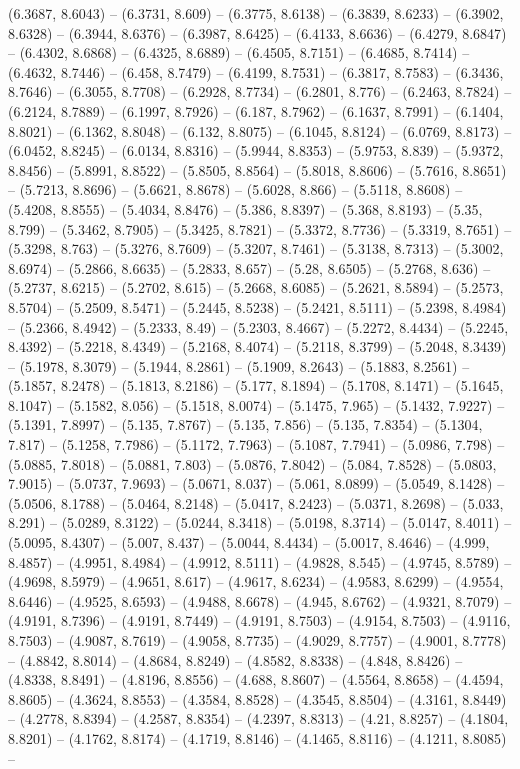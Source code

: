 (6.3687, 8.6043) -- (6.3731, 8.609) -- (6.3775, 8.6138) -- (6.3839, 8.6233) -- (6.3902, 8.6328) -- (6.3944, 8.6376) -- (6.3987, 8.6425) -- (6.4133, 8.6636) -- (6.4279, 8.6847) -- (6.4302, 8.6868) -- (6.4325, 8.6889) -- (6.4505, 8.7151) -- (6.4685, 8.7414) -- (6.4632, 8.7446) -- (6.458, 8.7479) -- (6.4199, 8.7531) -- (6.3817, 8.7583) -- (6.3436, 8.7646) -- (6.3055, 8.7708) -- (6.2928, 8.7734) -- (6.2801, 8.776) -- (6.2463, 8.7824) -- (6.2124, 8.7889) -- (6.1997, 8.7926) -- (6.187, 8.7962) -- (6.1637, 8.7991) -- (6.1404, 8.8021) -- (6.1362, 8.8048) -- (6.132, 8.8075) -- (6.1045, 8.8124) -- (6.0769, 8.8173) -- (6.0452, 8.8245) -- (6.0134, 8.8316) -- (5.9944, 8.8353) -- (5.9753, 8.839) -- (5.9372, 8.8456) -- (5.8991, 8.8522) -- (5.8505, 8.8564) -- (5.8018, 8.8606) -- (5.7616, 8.8651) -- (5.7213, 8.8696) -- (5.6621, 8.8678) -- (5.6028, 8.866) -- (5.5118, 8.8608) -- (5.4208, 8.8555) -- (5.4034, 8.8476) -- (5.386, 8.8397) -- (5.368, 8.8193) -- (5.35, 8.799) -- (5.3462, 8.7905) -- (5.3425, 8.7821) -- (5.3372, 8.7736) -- (5.3319, 8.7651) -- (5.3298, 8.763) -- (5.3276, 8.7609) -- (5.3207, 8.7461) -- (5.3138, 8.7313) -- (5.3002, 8.6974) -- (5.2866, 8.6635) -- (5.2833, 8.657) -- (5.28, 8.6505) -- (5.2768, 8.636) -- (5.2737, 8.6215) -- (5.2702, 8.615) -- (5.2668, 8.6085) -- (5.2621, 8.5894) -- (5.2573, 8.5704) -- (5.2509, 8.5471) -- (5.2445, 8.5238) -- (5.2421, 8.5111) -- (5.2398, 8.4984) -- (5.2366, 8.4942) -- (5.2333, 8.49) -- (5.2303, 8.4667) -- (5.2272, 8.4434) -- (5.2245, 8.4392) -- (5.2218, 8.4349) -- (5.2168, 8.4074) -- (5.2118, 8.3799) -- (5.2048, 8.3439) -- (5.1978, 8.3079) -- (5.1944, 8.2861) -- (5.1909, 8.2643) -- (5.1883, 8.2561) -- (5.1857, 8.2478) -- (5.1813, 8.2186) -- (5.177, 8.1894) -- (5.1708, 8.1471) -- (5.1645, 8.1047) -- (5.1582, 8.056) -- (5.1518, 8.0074) -- (5.1475, 7.965) -- (5.1432, 7.9227) -- (5.1391, 7.8997) -- (5.135, 7.8767) -- (5.135, 7.856) -- (5.135, 7.8354) -- (5.1304, 7.817) -- (5.1258, 7.7986) -- (5.1172, 7.7963) -- (5.1087, 7.7941) -- (5.0986, 7.798) -- (5.0885, 7.8018) -- (5.0881, 7.803) -- (5.0876, 7.8042) -- (5.084, 7.8528) -- (5.0803, 7.9015) -- (5.0737, 7.9693) -- (5.0671, 8.037) -- (5.061, 8.0899) -- (5.0549, 8.1428) -- (5.0506, 8.1788) -- (5.0464, 8.2148) -- (5.0417, 8.2423) -- (5.0371, 8.2698) -- (5.033, 8.291) -- (5.0289, 8.3122) -- (5.0244, 8.3418) -- (5.0198, 8.3714) -- (5.0147, 8.4011) -- (5.0095, 8.4307) -- (5.007, 8.437) -- (5.0044, 8.4434) -- (5.0017, 8.4646) -- (4.999, 8.4857) -- (4.9951, 8.4984) -- (4.9912, 8.5111) -- (4.9828, 8.545) -- (4.9745, 8.5789) -- (4.9698, 8.5979) -- (4.9651, 8.617) -- (4.9617, 8.6234) -- (4.9583, 8.6299) -- (4.9554, 8.6446) -- (4.9525, 8.6593) -- (4.9488, 8.6678) -- (4.945, 8.6762) -- (4.9321, 8.7079) -- (4.9191, 8.7396) -- (4.9191, 8.7449) -- (4.9191, 8.7503) -- (4.9154, 8.7503) -- (4.9116, 8.7503) -- (4.9087, 8.7619) -- (4.9058, 8.7735) -- (4.9029, 8.7757) -- (4.9001, 8.7778) -- (4.8842, 8.8014) -- (4.8684, 8.8249) -- (4.8582, 8.8338) -- (4.848, 8.8426) -- (4.8338, 8.8491) -- (4.8196, 8.8556) -- (4.688, 8.8607) -- (4.5564, 8.8658) -- (4.4594, 8.8605) -- (4.3624, 8.8553) -- (4.3584, 8.8528) -- (4.3545, 8.8504) -- (4.3161, 8.8449) -- (4.2778, 8.8394) -- (4.2587, 8.8354) -- (4.2397, 8.8313) -- (4.21, 8.8257) -- (4.1804, 8.8201) -- (4.1762, 8.8174) -- (4.1719, 8.8146) -- (4.1465, 8.8116) -- (4.1211, 8.8085) -- 